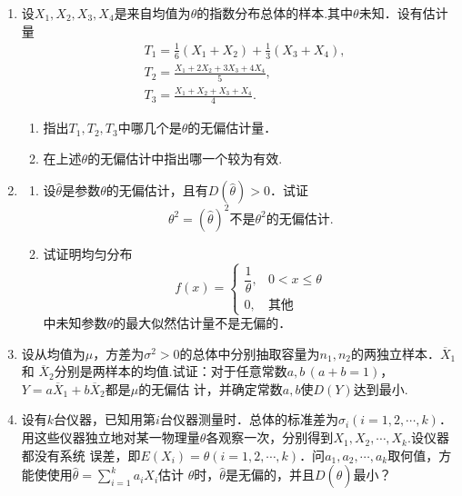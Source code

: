 \begin{enumerate}
    \item 设$X_1,X_2,X_3,X_4$是来自均值为$\theta$的指数分布总体的样本.其中$\theta$未知．设有估计量
    \begin{equation}
        \begin{split}
            & T_1=\frac{1}{6}(X_1+X_2)+\frac{1}{3}(X_3+X_4),\\
            & T_2=\frac{X_1+2X_2+3X_3+4X_4}{5},\\
            & T_3=\frac{X_1+X_2+X_3+X_4}{4}.
        \end{split}
        \nonumber
    \end{equation}
    \begin{enumerate}
        \item 指出$T_1,T_2,T_3$中哪几个是$\theta$的无偏估计量．
        \item 在上述$\theta$的无偏估计中指出哪一个较为有效.
    \end{enumerate}



    \item \begin{enumerate}
        \item 设$\hat{\theta}$是参数$\theta$的无偏估计，且有$D(\hat{\theta})>0$．试证
        $$\hat{\theta^2}=(\hat{\theta})^2\mbox{不是}\theta^2\mbox{的无偏估计.}$$
        \item 试证明均匀分布
        $$f(x)=\left\{\begin{array}{ll}
            \dfrac{1}{\theta}, & 0<x\leq \theta\\
            0, & \mbox{其他}
        \end{array}\right.$$
        中未知参数$\theta$的最大似然估计量不是无偏的．
    \end{enumerate}




    \item 设从均值为$\mu$，方差为$\sigma^2>0$的总体中分别抽取容量为$n_1,n_2$的两独立样本．$\overline{X}_1$和
    $\overline{X}_2$分别是两样本的均值.试证：对于任意常数$a,b\, (a+b=1)$，$Y=a\overline{X}_1+b\overline{X}_2$都是$\mu$的无偏估
    计，并确定常数$a,b$使$D(Y)$达到最小.




    \item 设有$k$台仪器，已知用第$i$台仪器测量时．总体的标准差为$\sigma_i(i=1,2,\cdots,k)$．
    用这些仪器独立地对某一物理量$\theta$各观察一次，分别得到$X_1,X_2,\cdots,X_k$.设仪器都没有系统
    误差，即$E(X_i)=\theta(i=1,2,\cdots,k)$．问$a_1,a_2,\cdots,a_k$取何值，方能使使用$\displaystyle{\hat{\theta}=\sum_{i=1}^k a_iX_i}$估计
    $\theta$时，$\hat{\theta}$是无偏的，并且$D(\hat{\theta})$最小？





\end{enumerate}
